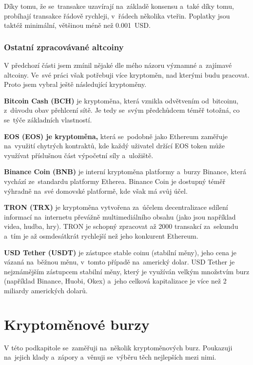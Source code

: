 \documentclass[thesis=B,czech]{FITthesis}[2019/03/21]
\begin{document}
Díky tomu, že se~transakce uzavírají na~základě konsensu a~také díky tomu, probíhají transakce řádově rychleji, v~řádech několika vteřin. Poplatky jsou taktéž minimální, většinou méně než 0.001~USD. \cite{bitinfocharts} \cite{coincodex_ripple}

\subsubsection{Ostatní zpracovávané altcoiny}
V předchozí části jsem zmínil nějaké dle mého názoru významné a~zajímavé altcoiny. Ve~své práci však potřebuji více kryptoměn, nad kterými budu pracovat. Proto jsem vybral ještě následující kryptoměny.

\textbf{Bitcoin Cash (BCH)} je kryptoměna, která vznikla odvětvením od~bitcoinu, z~důvodu obav přehlcení sítě. Je tedy se~svým předchůdcem téměř totožná, co se~týče základních vlastností. \cite{kurzy_bch}

\textbf{EOS (EOS) je kryptoměna,} která se~podobně jako Ethereum zaměřuje na~využití chytrých kontraktů, kde každý uživatel držící EOS token může využívat \linebreak příslušnou část výpočetní síly a~uložiště. \cite{finex_eos}

\textbf{Binance Coin (BNB)} je interní kryptoměna platformy a~burzy Binance, která vychází ze~standardu platformy Etherea. Binance Coin je dostupný téměř výhradně na~své domovské platformě, kde však má svůj účel. \cite{martin_sistek_bnb}

\textbf{TRON (TRX)} je kryptoměna vytvořena za~účelem decentralizace sdílení informací na~internetu převážně multimediálního obsahu (jako jsou například videa, hudba, hry). TRON je schopný zpracovat až 2000 transakcí za~sekundu a~tím je až osmdesátkrát rychlejší než jeho konkurent Ethereum. \cite{finex_trx}

\textbf{USD Tether (USDT)} je zástupce stable coinu (stabilní měny), jeho cena je vázaná na~běžnou měnu, v~tomto případě na~americký dolar. USD Tether je nejznámějším zástupcem stabilní měny, který je využíván velkým množstvím burz (například Binance, Huobi, Okex) a~jeho celková kapitalizace je více než 2 miliardy amerických dolarů. \cite{mlady_investor_stable_coin} 

\section{Kryptoměnové burzy}
\label{cryptocurrency_exchanges}
V této podkapitole se~zaměřuji na~několik kryptoměnových burz. Poukazuji na~jejich klady a~zápory a~věnuji se~výběru těch nejlepších mezi nimi.
\end{document}
